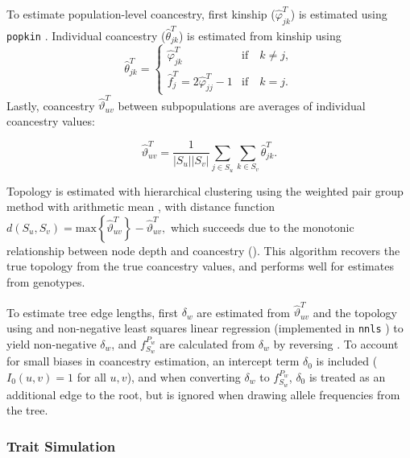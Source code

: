 \documentclass[9pt,lineno]{elife}
\newcommand{\f}[2]{f^{#1}_{#2}}
\newcommand{\ktHat}[1][k]{\hat{\varphi}_{j#1}^T}
\newcommand{\ftHat}[1][j]{\hat{f}_{#1}^T}
\begin{document}
To estimate population-level coancestry, first kinship ($\ktHat$) is estimated using \texttt{popkin} \citep{ochoa_estimating_2021}.
Individual coancestry ($\hat{\theta}_{jk}^T$) is estimated from kinship using
\begin{equation}
  \label{eq:kinship_to_coanc}
  \hat{\theta}_{jk}^T
  =
  \begin{cases}
    \ktHat & \text{if} \quad k \ne j, \\
    \ftHat = 2 \ktHat[j] - 1 & \text{if} \quad k = j.
  \end{cases}
\end{equation}
Lastly, coancestry $\hat{\vartheta}_{uv}^T$ between subpopulations are averages of individual coancestry values:
\begin{linenomath*}
  $$
  \hat{\vartheta}_{uv}^T
  =
  \frac{1}{|S_u||S_v|} \sum_{j \in S_u} \sum_{k \in S_v} \hat{\theta}_{jk}^T
  .
  $$
\end{linenomath*}

Topology is estimated with hierarchical clustering using the weighted pair group method with arithmetic mean \citep{sokal_statistical_1958}, with distance function
$
d( S_u, S_v ) = \text{max} \left\{ \hat{\vartheta}_{uv}^T \right\} - \hat{\vartheta}_{uv}^T,
$
which succeeds due to the monotonic relationship between node depth and coancestry ().
This algorithm recovers the true topology from the true coancestry values, and performs well for estimates from genotypes.

To estimate tree edge lengths, first $\delta_w$ are estimated from $\hat{\vartheta}_{uv}^T$ and the topology using  and non-negative least squares linear regression \citep{lawson_solving_1974} (implemented in \texttt{nnls} \citep{mullen_nnls_2012}) to yield non-negative $\delta_w$, and $\f{P_w}{S_w}$ are calculated from $\delta_w$ by reversing .
To account for small biases in coancestry estimation, an intercept term $\delta_0$ is included ($I_0(u,v) = 1$ for all $u,v$), and when converting $\delta_w$ to $\f{P_w}{S_w}$, $\delta_0$ is treated as an additional edge to the root, but is ignored when drawing allele frequencies from the tree.


\subsubsection{Trait Simulation}

\label{sec:trait_sim}
\end{document}
